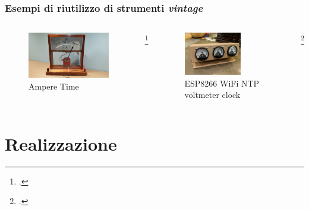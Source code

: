 \documentclass[aspectratio=169]{beamer}
\begin{document}
\begin{frame}
\frametitle{Esempi di riutilizzo di strumenti \textit{vintage}}
\begin{columns}
\begin{column}{0.5\textwidth}
\begin{figure}[h]
  \centering
  \includegraphics[width=\textwidth]{amperetime}
  \caption{Ampere Time\footnotemark}
\end{figure}
\end{column}
\footcitetext{amperetime}

\begin{column}{0.5\textwidth}

\begin{figure}[h]
  \centering
  \includegraphics[width=0.7\textwidth]{voltclock}
  \caption{ESP8266 WiFi NTP voltmeter clock\footnotemark}
\end{figure}
\end{column}
\footcitetext{voltclock}
\end{columns}
\end{frame}%


\section{Realizzazione}
\end{document}
